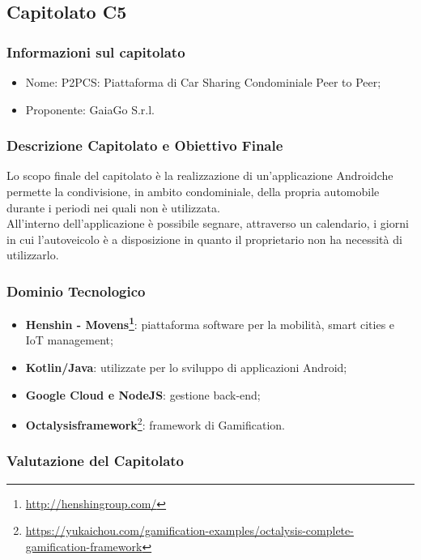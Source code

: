 \subsection{Capitolato C5}\label{C5}

\subsubsection{Informazioni sul capitolato}
\begin{itemize}
  \item{Nome}: P2PCS: Piattaforma di Car Sharing Condominiale Peer to Peer;
  \item{Proponente}: GaiaGo S.r.l.
\end{itemize}

\subsubsection{Descrizione Capitolato e Obiettivo Finale}
Lo scopo finale del capitolato è la realizzazione di un'applicazione Android\glossario che permette la condivisione, in ambito condominiale, della propria automobile durante i periodi nei quali non è utilizzata.\\
All'interno dell'applicazione è possibile segnare, attraverso un calendario, i giorni in cui l'autoveicolo è a disposizione in quanto il proprietario non ha necessità di utilizzarlo.

\subsubsection{Dominio Tecnologico}
\begin{itemize}
  \item \textbf{Henshin - Movens\footnote{\url{http://henshingroup.com/}}}: piattaforma software per la mobilità, smart cities e IoT management;
  \item \textbf{Kotlin/Java}: utilizzate per lo sviluppo di applicazioni Android;
  \item \textbf{Google Cloud e NodeJS}: gestione back-end;
  \item \textbf{Octalysis\glossario framework}\footnote{\url{https://yukaichou.com/gamification-examples/octalysis-complete-gamification-framework}}: framework di Gamification\glossario.
  
\end{itemize}

\subsubsection{Valutazione del Capitolato}
